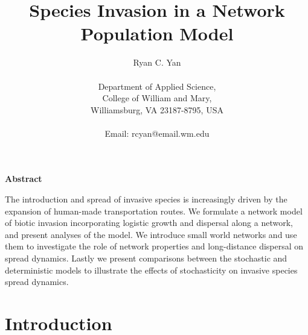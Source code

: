\documentclass[12pt, openany]{book}
\theoremstyle{definition}
\theoremstyle{remark}
\numberwithin{equation}{chapter}
\numberwithin{figure}{chapter}
\begin{document}
\frontmatter
\title{Species Invasion in a Network Population Model}
\author{{\large Ryan C. Yan} \\
\\
{\small Department of Applied Science,}\\
{\small College of William and Mary,}\\
{\small Williamsburg, VA 23187-8795, USA }\\
\\
{\small Email:  rcyan@email.wm.edu }}
\date{}
\maketitle


\pagestyle{plain}

\newcommand{\ds}{\displaystyle}
\newcommand{\ep}{\varepsilon}
\newcommand{\la}{\lambda}
\newcommand{\R}{{\mathbf R}}
\newcommand{\Rp}{{\mathbf R}^+}
\newcommand{\rn}{{\mathbf R}^n}
\newcommand{\noi}{\noindent}


\maketitle

\begin{center}
\begin{minipage}{120mm}
\begin{center}{\bf Abstract}\end{center}

The introduction and spread of invasive species is increasingly driven by the expansion of human-made transportation routes. We formulate a network model of biotic invasion incorporating logistic growth and dispersal along a network, and present analyses of the model. We introduce small world networks and use them to investigate the role of network properties and long-distance dispersal on spread dynamics. Lastly we present comparisons between the stochastic and deterministic models to illustrate the effects of stochasticity on invasive species spread dynamics.

\end{minipage}
\end{center}
\setcounter{page}{2}

\tableofcontents

{\listoffigures \let\cleardoublepage\clearpage}
 \mainmatter

\chapter{Introduction}
\end{document}

